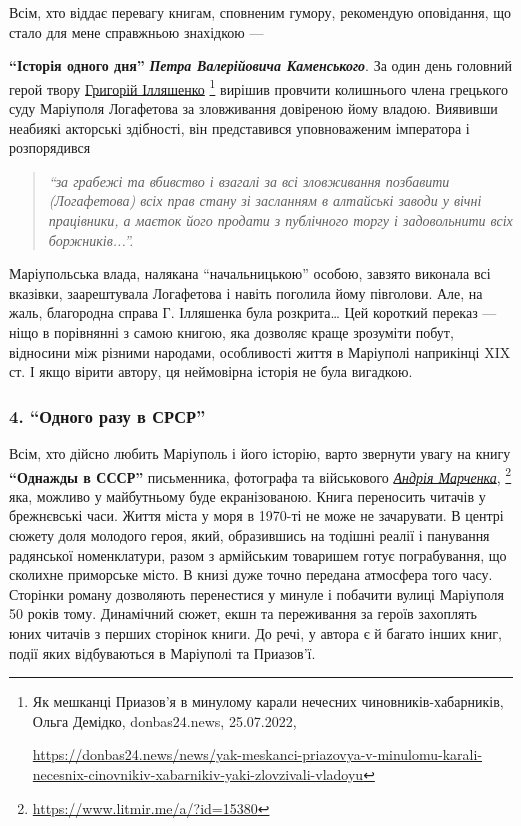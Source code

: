 Всім, хто віддає перевагу книгам, сповненим гумору, рекомендую оповідання, що
стало для мене справжньою знахідкою — \par\noindent\textbf{\enquote{Історія одного дня}} \emph{\textbf{Петра Валерійовича
Каменського}}. За один день головний герой твору \href{https://donbas24.news/news/yak-meskanci-priazovya-v-minulomu-karali-necesnix-cinovnikiv-xabarnikiv-yaki-zlovzivali-vladoyu}{Григорій Ілляшенко}%
\footnote{Як мешканці Приазов'я в минулому карали нечесних чиновників-хабарників, Ольга Демідко, donbas24.news, 25.07.2022, \par%
\url{https://donbas24.news/news/yak-meskanci-priazovya-v-minulomu-karali-necesnix-cinovnikiv-xabarnikiv-yaki-zlovzivali-vladoyu}%
}
вирішив провчити колишнього члена грецького суду Маріуполя Логафетова за зловживання
довіреною йому владою. Виявивши неабиякі акторські здібності, він представився
уповноваженим імператора і розпорядився 
\begin{quote}
\em\enquote{за грабежі та вбивство і взагалі за
всі зловживання позбавити (Логафетова) всіх прав стану зі засланням в алтайські
заводи у вічні працівники, а маєток його продати з публічного торгу і
задовольнити всіх боржників...}. 
\end{quote}
Маріупольська влада, налякана \enquote{начальницькою}
особою, завзято виконала всі вказівки, заарештувала Логафетова і навіть
поголила йому півголови. Але, на жаль, благородна справа Г. Ілляшенка була
розкрита… Цей короткий переказ — ніщо в порівнянні з самою книгою, яка дозволяє
краще зрозуміти побут, відносини між різними народами, особливості життя в
Маріуполі наприкінці XIX ст. І якщо вірити автору, ця неймовірна історія не
була вигадкою.

\subsubsection{4. \enquote{Одного разу в СРСР}}


Всім, хто дійсно любить Маріуполь і його історію, варто звернути увагу на книгу
\textbf{\enquote{Однажды в СССР}} письменника, фотографа та військового \href{https://www.litmir.me/a/?id=15380}{\emph{Андрія Марченка}},
\footnote{\url{https://www.litmir.me/a/?id=15380}}
яка, можливо у майбутньому буде екранізованою. Книга переносить читачів у
брежнєвські часи. Життя міста у моря в 1970-ті не може не зачарувати. В центрі
сюжету доля молодого героя, який, образившись на тодішні реалії і панування
радянської номенклатури, разом з армійським товаришем готує пограбування, що
сколихне приморське місто. В книзі дуже точно передана атмосфера того часу.
Сторінки роману дозволяють перенестися у минуле і побачити вулиці Маріуполя 50
років тому. Динамічний сюжет, екшн та переживання за героїв захоплять юних
читачів з перших сторінок книги. До речі, у автора є й багато інших книг,
події яких відбуваються в Маріуполі та Приазов'ї.

